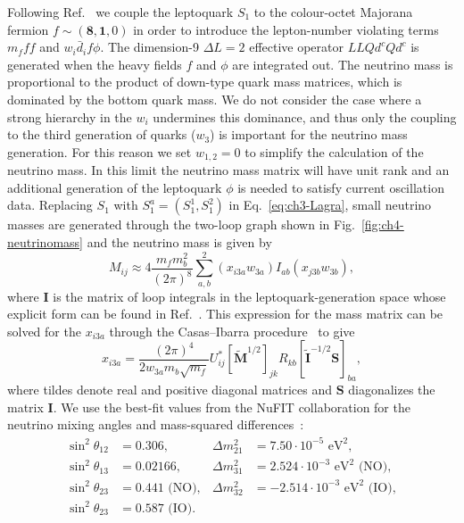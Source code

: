 Following Ref.~\cite{Angel:2013hla} we couple the leptoquark $S_{1}$ to the
colour-octet Majorana fermion $f \sim (\mathbf{8}, \mathbf{1}, 0)$ in order to
introduce the lepton-number violating terms $m_f f f$ and
$w_i \bar{d}_i f \phi$. The dimension-9 $\Delta L = 2$ effective operator
$LLQd^cQd^c$ is generated when the heavy fields $f$ and $\phi$ are integrated
out. The neutrino mass is proportional to the product of down-type quark mass
matrices, which is dominated by the bottom quark mass. We do not consider the
case where a strong hierarchy in the $w_i$ undermines this dominance, and thus
only the coupling to the third generation of quarks ($w_3$) is important for the
neutrino mass generation. For this reason we set $w_{1,2} = 0$ to simplify the
calculation of the neutrino mass. In this limit the neutrino mass matrix will
have unit rank and an additional generation of the leptoquark $\phi$ is needed
to satisfy current oscillation data. Replacing $S_{1}$ with
$S_{1}^{a} = (S^{1}_1, S_1^{2})$ in Eq.~\eqref{eq:ch3-Lagra}, small neutrino
masses are generated through the two-loop graph shown in
Fig.~\ref{fig:ch4-neutrinomass} and the neutrino mass is given by
\begin{equation}
  \label{eq:ch4-massformula}
  M_{ij} \approx 4\frac{m_f
    m_b^2}{(2\pi)^8} \sum_{a, b}^2 (x_{i3a} w_{3a}) I_{ab}
  (x_{j3b} w_{3b}),
\end{equation}
where $\mathbf{I}$ is the matrix of loop integrals in the leptoquark-generation
space whose explicit form can be found in Ref.~\cite{Angel:2013hla}. This
expression for the mass matrix can be solved for the $x_{i3a}$ through the
Casas--Ibarra procedure~\cite{Casas:2001sr} to give
\begin{equation}
  \label{eq:ch4-ci}
  x_{i3a} = \frac{(2\pi)^4}{2w_{3a}m_b\sqrt{m_f}} U^*_{ij} [\tilde{\mathbf{M}}^{1/2}]_{jk} R_{kb} [\tilde{\mathbf{I}}^{-1/2}\mathbf{S}]_{ba},
\end{equation}
where tildes denote real and positive diagonal matrices and $\mathbf{S}$
diagonalizes the matrix $\mathbf{I}$. We use the best-fit values from the NuFIT
collaboration for the neutrino mixing angles and mass-squared
differences~\cite{Esteban:2016qun, nufitweb}:
\begin{equation}
  \begin{aligned}
    \sin^2 \theta_{12} &= 0.306,   & \Delta m_{21}^2 &= 7.50 \cdot 10^{-5} \text{ eV}^{2},\\
    \sin^2 \theta_{13} &= 0.02166, & \Delta m_{31}^2 &= 2.524 \cdot 10^{-3} \text{ eV}^{2} \text{ (NO)},\\
    \sin^2 \theta_{23} &= 0.441 \text{ (NO)},   & \Delta m_{32}^2 &= -2.514 \cdot 10^{-3} \text{ eV}^{2} \text{ (IO)},\\
    \sin^2 \theta_{23} &= 0.587 \text{ (IO)}.
  \end{aligned}
\end{equation}

